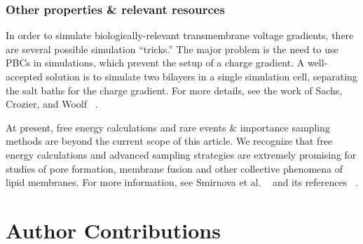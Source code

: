 \documentclass[9pt,bestpractices,pubversion]{livecoms}
\begin{document}
\subsubsection{Other properties \& relevant resources}
\label{subsubsec:otherprops}
In order to simulate biologically-relevant transmembrane voltage gradients, there are several possible simulation ``tricks.''
The major problem is the need to use PBCs in simulations, which prevent the setup of a charge gradient.
A well-accepted solution is to simulate two bilayers in a single simulation cell, separating the salt baths for the charge gradient.
For more details, see the work of Sachs, Crozier, and Woolf ~\cite{Sachs2004}.

At present, free energy calculations and rare events \& importance sampling methods are beyond the current scope of this article.
We recognize that free energy calculations and advanced sampling strategies are extremely promising for studies of pore formation, membrane fusion and other collective phenomena of lipid membranes.
For more information, see Smirnova et al. ~\cite{Smirnova2015} and its references ~\cite{Venable2015,Marrink2004}.

%
%


\section{Author Contributions}
%
\end{document}
